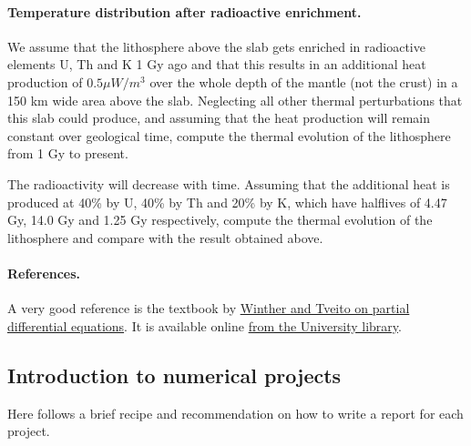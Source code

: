 \documentclass[%
oneside,                 %
final,                   %
10pt]{article}
\begin{document}
\paragraph{Temperature distribution after radioactive enrichment.}
We assume that the lithosphere above the slab gets enriched in
radioactive elements U, Th and K 1 Gy ago and that this results in an
additional heat production of $0.5\mu W/m^3$ over the whole depth of
the mantle (not the crust) in a 150 km wide area above the
slab. Neglecting all other thermal perturbations that this slab could
produce, and assuming that the heat production will remain constant
over geological time, compute the thermal evolution of the lithosphere
from 1 Gy to present.

The radioactivity will decrease with time. Assuming that the
additional heat is produced at 40\% by U, 40\% by Th and 20\% by K,
which have halflives of 4.47 Gy, 14.0 Gy and 1.25 Gy respectively,
compute the thermal evolution of the lithosphere and compare with the
result obtained above.






\paragraph{References.}
A very good reference is the textbook by \href{{http://www.springer.com/us/book/9783540225515}}{Winther and Tveito on partial differential equations}. It is available online \href{{https://vpn2.uio.no/+CSCO+0h756767633A2F2F797661782E66636576617472652E70627A++/book/10.1007/b138016/page/1}}{from the University library}.


\subsection*{Introduction to numerical projects}

Here follows a brief recipe and recommendation on how to write a report for each
project.
\end{document}
